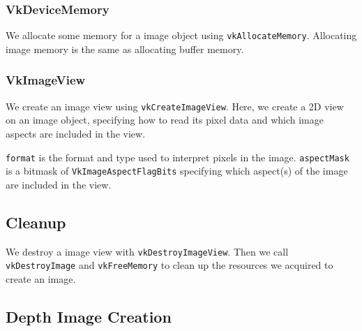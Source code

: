 \subsubsection{VkDeviceMemory}

We allocate some memory for a image object using \texttt{vkAllocateMemory}.
Allocating image memory is the same as allocating buffer memory.

\begin{minipage}{\linewidth}{\noindent}
    
\end{minipage}

\subsubsection{VkImageView}

We create an image view using \texttt{vkCreateImageView}.
Here, we create a 2D view on an image object, specifying
how to read its pixel data and which image aspects
are included in the view.

\begin{minipage}{\linewidth}{\noindent}
    
\end{minipage}

\texttt{format} is the format and type used to interpret pixels in the image.
\texttt{aspectMask} is a bitmask of \texttt{VkImageAspectFlagBits}
specifying which aspect(s) of the image are included in the view.

\subsection{Cleanup}

We destroy a image view with \texttt{vkDestroyImageView}.
Then we call \texttt{vkDestroyImage} and \texttt{vkFreeMemory}
to clean up the resources we acquired to create an image.

\subsection{Depth Image Creation}

